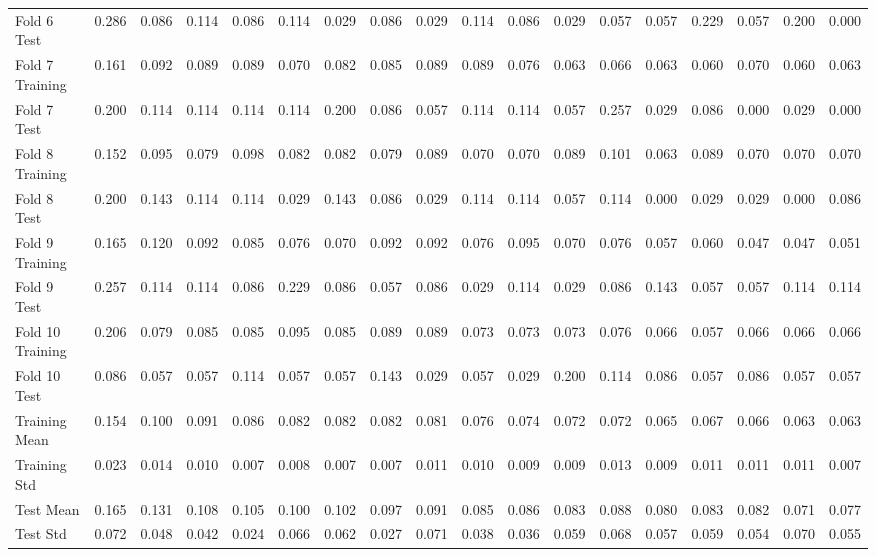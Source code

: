 \documentclass[12pt,oneside,a4paper]{article}
\begin{document}
\begin{landscape}
\begin{table}[ht]
\begin{tabular}{lrrrrrrrrrrrrrrrrr}
  Fold 6 Test & 0.286 & 0.086 & 0.114 & 0.086 & 0.114 & 0.029 & 0.086 & 0.029 & 0.114 & 0.086 & 0.029 & 0.057 & 0.057 & 0.229 & 0.057 & 0.200 & 0.000 \\
  Fold 7 Training & 0.161 & 0.092 & 0.089 & 0.089 & 0.070 & 0.082 & 0.085 & 0.089 & 0.089 & 0.076 & 0.063 & 0.066 & 0.063 & 0.060 & 0.070 & 0.060 & 0.063 \\
  Fold 7 Test & 0.200 & 0.114 & 0.114 & 0.114 & 0.114 & 0.200 & 0.086 & 0.057 & 0.114 & 0.114 & 0.057 & 0.257 & 0.029 & 0.086 & 0.000 & 0.029 & 0.000 \\
  Fold 8 Training & 0.152 & 0.095 & 0.079 & 0.098 & 0.082 & 0.082 & 0.079 & 0.089 & 0.070 & 0.070 & 0.089 & 0.101 & 0.063 & 0.089 & 0.070 & 0.070 & 0.070 \\
  Fold 8 Test & 0.200 & 0.143 & 0.114 & 0.114 & 0.029 & 0.143 & 0.086 & 0.029 & 0.114 & 0.114 & 0.057 & 0.114 & 0.000 & 0.029 & 0.029 & 0.000 & 0.086 \\
  Fold 9 Training & 0.165 & 0.120 & 0.092 & 0.085 & 0.076 & 0.070 & 0.092 & 0.092 & 0.076 & 0.095 & 0.070 & 0.076 & 0.057 & 0.060 & 0.047 & 0.047 & 0.051 \\
  Fold 9 Test & 0.257 & 0.114 & 0.114 & 0.086 & 0.229 & 0.086 & 0.057 & 0.086 & 0.029 & 0.114 & 0.029 & 0.086 & 0.143 & 0.057 & 0.057 & 0.114 & 0.114 \\
  Fold 10 Training & 0.206 & 0.079 & 0.085 & 0.085 & 0.095 & 0.085 & 0.089 & 0.089 & 0.073 & 0.073 & 0.073 & 0.076 & 0.066 & 0.057 & 0.066 & 0.066 & 0.066 \\
  Fold 10 Test & 0.086 & 0.057 & 0.057 & 0.114 & 0.057 & 0.057 & 0.143 & 0.029 & 0.057 & 0.029 & 0.200 & 0.114 & 0.086 & 0.057 & 0.086 & 0.057 & 0.057 \\
  Training Mean & 0.154 & 0.100 & 0.091 & 0.086 & 0.082 & 0.082 & 0.082 & 0.081 & 0.076 & 0.074 & 0.072 & 0.072 & 0.065 & 0.067 & 0.066 & 0.063 & 0.063 \\
  Training Std & 0.023 & 0.014 & 0.010 & 0.007 & 0.008 & 0.007 & 0.007 & 0.011 & 0.010 & 0.009 & 0.009 & 0.013 & 0.009 & 0.011 & 0.011 & 0.011 & 0.007 \\
  Test Mean & 0.165 & 0.131 & 0.108 & 0.105 & 0.100 & 0.102 & 0.097 & 0.091 & 0.085 & 0.086 & 0.083 & 0.088 & 0.080 & 0.083 & 0.082 & 0.071 & 0.077 \\
  Test Std & 0.072 & 0.048 & 0.042 & 0.024 & 0.066 & 0.062 & 0.027 & 0.071 & 0.038 & 0.036 & 0.059 & 0.068 & 0.057 & 0.059 & 0.054 & 0.070 & 0.055 \\
   \bottomrule
\end{tabular}
\label{tab:rf1}
\end{table}




\end{landscape}
\end{document}
